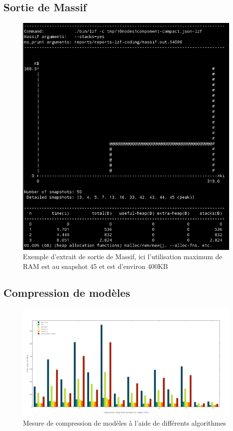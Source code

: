 \subsection{\label{massif}Sortie de Massif}
\begin{figure}[ht!]
\centering
\includegraphics[scale=0.7]{images/msprint.png}
\caption{Exemple d'extrait de sortie de Massif, ici l'utilisation maximum de RAM est au snapshot 45 et est d'environ 400KB}
\end{figure}

\begin{landscape}
\subsection{\label{comp-tabde}Compression de modèles}
\begin{figure}[ht!]
\centering
\includegraphics[scale=0.45]{images/compression.png}
\caption{Mesure de compression de modèles à l'aide de différents algorithmes}
\end{figure}
\end{landscape}